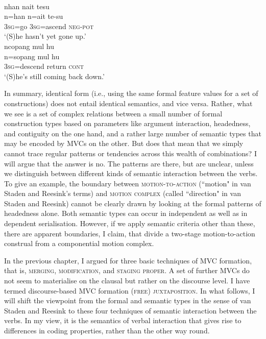 \ea \label{Tabap300}
\\
\ea
\glll nhan nait tesu \\
n=han n=ait te-su \\
\textsc{3}\textsc{sg}=go \textsc{3}\textsc{sg}=ascend \textsc{neg}-\textsc{pot} \\
\glft `(S)he hasn't yet gone up.' \\ 
\ex
\glll ncopang mul hu \\ 
n=sopang mul hu \\
\textsc{3}\textsc{sg}=descend return \textsc{cont} \\
\glft `(S)he's still coming back down.'\\ 
\z
\z

In summary, identical form (i.e., using the same formal feature values for a set of constructions) does not entail identical semantics, and vice versa. Rather, what we see is a set of complex relations between a small number of formal construction types based on parameters like argument interaction, headedness, and contiguity on the one hand, and a rather large number of semantic types that may be encoded by MVCs on the other. But does that mean that we simply cannot trace regular patterns or tendencies across this wealth of combinations? I will argue that the answer is no. The patterns are there, but are unclear, unless we distinguish between different kinds of semantic interaction between the verbs. To give an example, the boundary between \textsc{motion-to-action} (``motion" in van Staden and Reesink's terms) and \textsc{motion complex} (called ``direction" in van Staden and Reesink) cannot be clearly drawn by looking at the formal patterns of headedness alone. Both semantic types can occur in independent as well as in dependent serialisation. However, if we apply semantic criteria other than these, there are apparent boundaries, I claim, that divide a two-stage motion-to-action construal from a componential motion complex. 

In the previous chapter, I argued for three basic techniques of MVC formation, that is, \textsc{merging}, \textsc{modification}, and \textsc{staging proper}. A set of further MVCs do not seem to materialise on the clausal but rather on the discourse level. I have termed discourse-based MVC formation \textsc{(free) juxtaposition}. In what follows, I will shift the viewpoint from the formal and semantic types in the sense of van Staden and Reesink to these four techniques of semantic interaction between the verbs. In my view, it is the semantics of verbal interaction that gives rise to differences in coding properties, rather than the other way round. 

